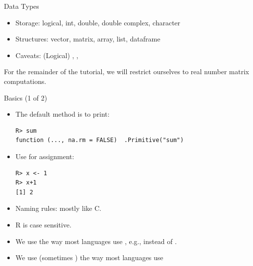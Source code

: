 \begin{frame}
  \begin{block}{Data Types}\pause
  \begin{itemize}[<+-|alert@+>]
    \item Storage:  logical, int, double, double complex, character
    \item Structures:  vector, matrix, array, list, dataframe
    \item Caveats:  (Logical) , , 
  \end{itemize}
  For the remainder of the tutorial, we will restrict ourselves to real number matrix computations.
\end{block}
\end{frame}




\begin{frame}[fragile]
  \begin{block}{Basics (1 of 2)}\pause
  \begin{itemize}[<+-|alert@+>]
    \item The default method is to print:
    \vspace{-.4cm}
    \begin{lstlisting}[backgroundcolor=\color{white},basicstyle=\ttfamily\color{dkgray}\scriptsize,keywordstyle=\color{black}, 
  commentstyle=\color{orange},stringstyle=\color{mauve}]
R> sum
function (..., na.rm = FALSE)  .Primitive("sum")
    \end{lstlisting} 
    \item Use \code{<-} for assignment:    \vspace{-.4cm}
    \begin{lstlisting}[backgroundcolor=\color{white},basicstyle=\ttfamily\color{dkgray}\scriptsize,keywordstyle=\color{black}, 
  commentstyle=\color{orange},stringstyle=\color{mauve}]
R> x <- 1
R> x+1
[1] 2
    \end{lstlisting}
    \item Naming rules:  mostly like C.
    \item R is case sensitive.
    \item We use  the way most languages use \code{_}, e.g.,  instead of .
    \item We use \code{\$} (sometimes ) the way most languages use 
  \end{itemize}
\end{block}
\end{frame}

